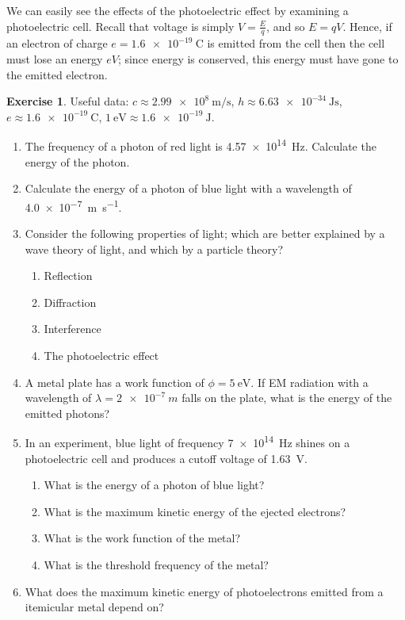 \documentclass[a4paper]{amsbook}
\theoremstyle{definition}
\newtheorem{exercise}{Exercise}
\numberwithin{exercise}{chapter}
\numberwithin{exercise}{chapter}
\begin{document}
We can easily see the effects of the photoelectric effect by examining a photoelectric cell.
Recall that voltage is simply $ V = \frac{E}{q} $, and so $ E = qV $. Hence, if an electron
of charge $ e = \SI{1.6e-19}{\coulomb} $ is emitted from the cell then the cell must
lose an energy $ eV $; since energy is conserved, this energy must have gone to the emitted
electron.

\begin{exercise}
  Useful data: $ c \approx \SI{2.99e8}{\metre\per\second} $, $ h \approx \SI{6.63e-34}{\joule\second} $,
  $ e \approx \SI{1.6e-19}{\coulomb} $, $ \SI{1}{\electronvolt} \approx \SI{1.6e-19}{\joule} $.
  \begin{enumerate}
    \item The frequency of a photon of red light is \SI{4.57e14}{\hertz}. Calculate the energy of the photon.
    \item Calculate the energy of a photon of blue light with a wavelength of \SI{4.0e-7}{\metre\per\second}.
    \item Consider the following properties of light; which are better explained by a wave theory of light, and
              which by a particle theory?
      \begin{enumerate}
        \item Reflection
        \item Diffraction
        \item Interference
        \item The photoelectric effect
      \end{enumerate}
    \item A metal plate has a work function of $ \phi = \SI{5}{\electronvolt} $. If EM radiation
              with a wavelength of $ \lambda = \SI{2e-7}{m} $ falls on the plate, what is the energy
              of the emitted photons?
    \item In an experiment, blue light of frequency \SI{7e14}{\hertz} shines on a photoelectric
              cell and produces a cutoff voltage of \SI{1.63}{\volt}.
      \begin{enumerate}
        \item What is the energy of a photon of blue light?
        \item What is the maximum kinetic energy of the ejected electrons?
        \item What is the work function of the metal?
        \item What is the threshold frequency of the metal?
      \end{enumerate}
    \item What does the maximum kinetic energy of photoelectrons emitted from a itemicular
              metal depend on?
  \end{enumerate}
\end{exercise}
\end{document}
